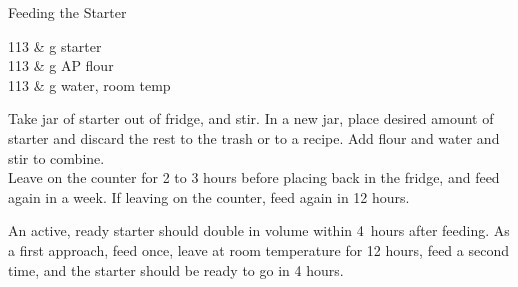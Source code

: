 \setHeadlines
{
}

\begin{recipe}
[ %
    source = Jim (and the rest of the internet),
]
{Feeding the Starter}

    \ingredients
    {
		113 & g starter \\
		113 & g AP flour \\
		113 & g water, room temp \\
    }
    
    \preparation
    {
        \step Take jar of starter out of fridge, and stir. In a new jar, place desired amount of starter and discard the rest to the trash or to a recipe. 
		\step Add flour and water and stir to combine. \\
		\step Leave on the counter for 2 to 3 hours before placing back in the fridge, and feed again in a week. If leaving on the counter, feed again in 12 hours. 
    }
	
	\suggestion
	{
		An active, ready starter should double in volume within 4~hours after feeding. As a first approach, feed once, leave at room temperature for 12 hours, feed a second time, and the starter should be ready to go in 4 hours.
	}

\end{recipe}
